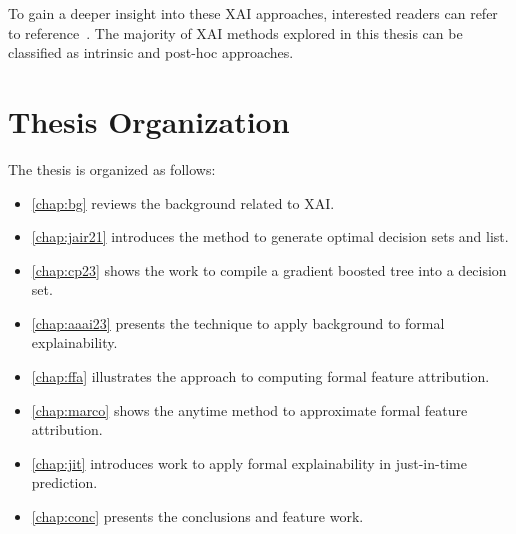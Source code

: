 To gain a deeper insight into these XAI approaches, interested readers can refer to
reference~\cite{asjaa-dmkd21,molnar-bk20,rai-jams20,darwiche-lics23,xudfzz-nlpcc19,hsmbs-xxai22,ignatiev-ijcai20,ms-rw22,msi-fai23}.
%
The majority of XAI methods explored in this thesis can be classified as intrinsic
and post-hoc approaches.





\section{Thesis Organization} \label{sec:structure}
The thesis is organized as follows:
\begin{itemize}
	\item \autoref{chap:bg} reviews the background related to XAI.
	\item \autoref{chap:jair21} introduces the method to generate optimal decision sets and list.
	\item \autoref{chap:cp23} shows the work to compile a gradient boosted tree into a
		decision set.
	\item \autoref{chap:aaai23} presents the technique to apply background to formal
		explainability.
	\item \autoref{chap:ffa}  illustrates the approach to computing formal feature attribution.
	\item \autoref{chap:marco}  shows the anytime method to approximate formal feature
		attribution.
	\item \autoref{chap:jit} introduces work to apply formal explainability in just-in-time
		prediction.
	\item \autoref{chap:conc} presents the conclusions and feature work.
\end{itemize}

